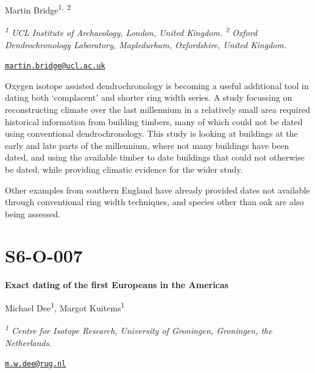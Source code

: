\documentclass[
]{book}
\begin{document}
Martin Bridge\textsuperscript{1,~2}

\emph{\textsuperscript{1} UCL Institute of Archaeology, London, United Kingdom. \textsuperscript{2} Oxford Dendrochronology Laboratory, Mapledurham, Oxfordshire, United Kingdom.}

\href{mailto:martin.bridge@ucl.ac.uk}{\nolinkurl{martin.bridge@ucl.ac.uk}}

Oxygen isotope assisted dendrochronology is becoming a useful additional tool in dating both `complacent' and shorter ring width series. A study focussing on reconstructing climate over the last millennium in a relatively small area required historical information from building timbers, many of which could not be dated using conventional dendrochronology. This study is looking at buildings at the early and late parts of the millennium, where not many buildings have been dated, and using the available timber to date buildings that could not otherwise be dated, while providing climatic evidence for the wider study.

Other examples from southern England have already provided dates not available through conventional ring width techniques, and species other than oak are also being assessed.

\hypertarget{s6-o-007}{%
\section*{S6-O-007}\label{s6-o-007}}

\textbf{Exact dating of the first Europeans in the Americas}

Michael Dee\textsuperscript{1}, Margot Kuitems\textsuperscript{1}

\emph{\textsuperscript{1} Centre for Isotope Research, University of Groningen, Groningen, the Netherlands.}

\href{mailto:m.w.dee@rug.nl}{\nolinkurl{m.w.dee@rug.nl}}
\end{document}
